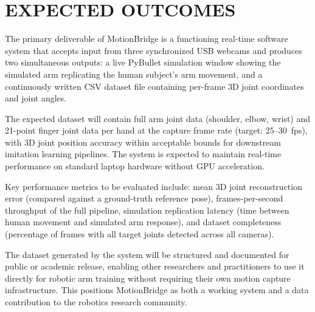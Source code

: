 \chapter{EXPECTED OUTCOMES}

The primary deliverable of MotionBridge is a functioning real-time software system that accepts input from three synchronized USB webcams and produces two simultaneous outputs: a live PyBullet simulation window showing the simulated arm replicating the human subject's arm movement, and a continuously written CSV dataset file containing per-frame 3D joint coordinates and joint angles.

The expected dataset will contain full arm joint data (shoulder, elbow, wrist) and 21-point finger joint data per hand at the capture frame rate (target: 25--30~fps), with 3D joint position accuracy within acceptable bounds for downstream imitation learning pipelines. The system is expected to maintain real-time performance on standard laptop hardware without GPU acceleration.

Key performance metrics to be evaluated include: mean 3D joint reconstruction error (compared against a ground-truth reference pose), frames-per-second throughput of the full pipeline, simulation replication latency (time between human movement and simulated arm response), and dataset completeness (percentage of frames with all target joints detected across all cameras).

The dataset generated by the system will be structured and documented for public or academic release, enabling other researchers and practitioners to use it directly for robotic arm training without requiring their own motion capture infrastructure. This positions MotionBridge as both a working system and a data contribution to the robotics research community.
